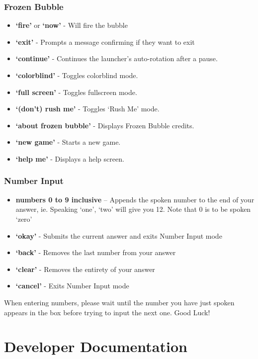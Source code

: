 \documentclass[11pt, oneside]{article}
\begin{document}
\subsubsection{Frozen Bubble}

\begin{itemize}
	\item {\bf`fire'} or {\bf`now'} - Will fire the bubble
	\item {\bf`exit'} - Prompts a message confirming if they want to exit
	\item {\bf`continue'} - Continues the launcher's auto-rotation after a pause.
	\item {\bf`colorblind'} - Toggles colorblind mode.
	\item {\bf`full screen'} - Toggles fullscreen mode.
	\item {\bf`(don't) rush me'} - Toggles `Rush Me' mode.
	\item {\bf`about frozen bubble'} - Displays Frozen Bubble credits.
	\item {\bf`new game'} - Starts a new game.
	\item {\bf`help me'} - Displays a help screen.
	
\end{itemize}

\subsubsection{Number Input}
\begin{itemize}
  \item {\bf numbers 0 to 9 inclusive} – Appends the spoken number
    to the end of your answer, ie. Speaking `one', `two' will give you
    12. Note that 0 is to be spoken `zero'
  \item {\bf `okay'} - Submits the current answer and exits Number
    Input mode
  \item {\bf `back'} - Removes the last number from your answer
  \item {\bf `clear'} - Removes the entirety of your answer
  \item {\bf `cancel'} - Exits Number Input mode
\end{itemize}

When entering numbers, please wait until the number you have just spoken appears
in the box before trying to input the next one.
Good Luck!

\pagebreak

\section{Developer Documentation}
\end{document}
